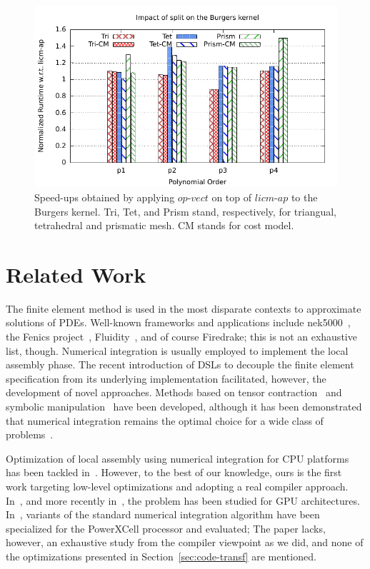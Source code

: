 \documentclass[conference]{IEEEtran}
\begin{document}



\begin{figure}[h]
\includegraphics[scale=0.7]{Pictures/burgers-normalized-split.pdf}
\caption{Speed-ups obtained by applying $op$-$vect$ on top of $licm$-$ap$ to the Burgers kernel. Tri, Tet, and Prism stand, respectively, for triangual, tetrahedral and prismatic mesh. CM stands for cost model.}
\label{fig:split-burgers-speedup}
\end{figure}


\section{Related Work}
\label{sec:related-work}
The finite element method is used in the most disparate contexts to approximate solutions of PDEs. Well-known frameworks and applications include nek5000~\cite{nek5000-web-page}, the Fenics project~\cite{Fenics}, Fluidity~\cite{fluidity_manual_v4}, and of course Firedrake; this is not an exhaustive list, though. Numerical integration is usually employed to implement the local assembly phase. The recent introduction of DSLs to decouple the finite element specification from its underlying implementation facilitated, however, the development of novel approaches. Methods based on tensor contraction~\cite{FFC-TC} and symbolic manipulation~\cite{Francis} have been developed, although it has been demonstrated that numerical integration remains the optimal choice for a wide class of problems~\cite{quadrature1}. 

Optimization of local assembly using numerical integration for CPU platforms has been tackled in~\cite{quadrature1}. However, to the best of our knowledge, ours is the first work targeting low-level optimizations and adopting a real compiler approach. In~\cite{Markall20101815}, and more recently in~\cite{petsc-integration-gpu}, the problem has been studied for GPU architectures. In~\cite{assembly-opencl}, variants of the standard numerical integration algorithm have been specialized for the PowerXCell processor and evaluated; The paper lacks, however, an exhaustive study from the compiler viewpoint as we did, and none of the optimizations presented in Section~\ref{sec:code-transf} are mentioned. 
\end{document}
